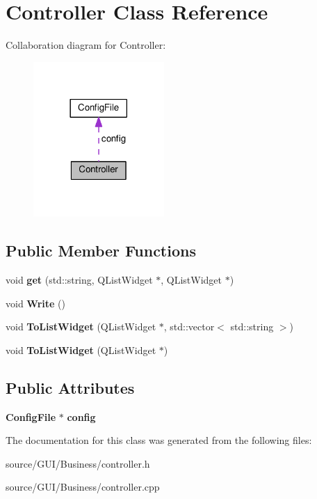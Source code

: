\section{Controller Class Reference}
\label{class_controller}


Collaboration diagram for Controller\+:\nopagebreak
\begin{figure}[H]
\begin{center}
\leavevmode
\includegraphics[width=141pt]{class_controller__coll__graph}
\end{center}
\end{figure}
\subsection*{Public Member Functions}
\begin{DoxyCompactItemize}
\item 
void {\bfseries get} (std\+::string, Q\+List\+Widget $\ast$, Q\+List\+Widget $\ast$)\label{class_controller_a1326b782c470a56f5c91772c9c9730e8}

\item 
void {\bfseries Write} ()\label{class_controller_a0bb1668e1ca7822db89f60481a061b7c}

\item 
void {\bfseries To\+List\+Widget} (Q\+List\+Widget $\ast$, std\+::vector$<$ std\+::string $>$)\label{class_controller_adb16f50be9b8861933099e883cd0b7b7}

\item 
void {\bfseries To\+List\+Widget} (Q\+List\+Widget $\ast$)\label{class_controller_ae3dd00a4e2c5d67100afdc4645dba47e}

\end{DoxyCompactItemize}
\subsection*{Public Attributes}
\begin{DoxyCompactItemize}
\item 
{\bf Config\+File} $\ast$ {\bfseries config}\label{class_controller_aba954e3e58980becc97c39150700bb1d}

\end{DoxyCompactItemize}


The documentation for this class was generated from the following files\+:\begin{DoxyCompactItemize}
\item 
source/\+G\+U\+I/\+Business/controller.\+h\item 
source/\+G\+U\+I/\+Business/controller.\+cpp\end{DoxyCompactItemize}
